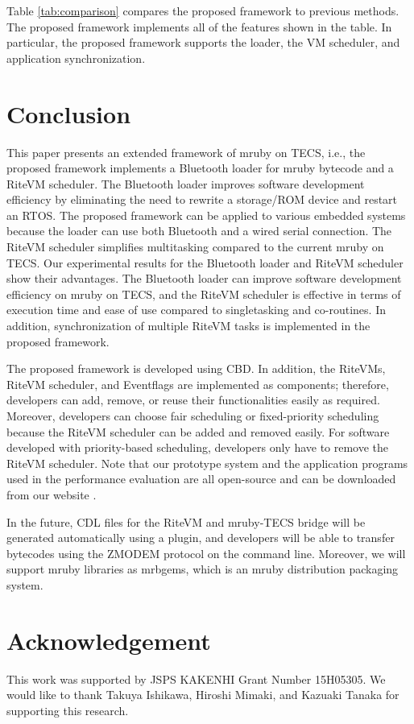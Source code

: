 \documentclass{sig-alternate-05-2015}
\begin{document}
Table \ref{tab:comparison} compares the proposed framework to previous methods.
The proposed framework implements all of the features shown in the table.
In particular, the proposed framework supports the loader, the VM scheduler, and application synchronization.
 
\section{Conclusion}
\label{sec:Conclusion}
This paper presents an extended framework of mruby on TECS, i.e., the proposed framework implements a Bluetooth loader for mruby bytecode and a RiteVM scheduler.
The Bluetooth loader improves software development efficiency by eliminating the need to rewrite a storage/ROM device and restart an RTOS.
The proposed framework can be applied to various embedded systems because the loader can use both Bluetooth and a wired serial connection.
The RiteVM scheduler simplifies multitasking compared to the current mruby on TECS.
Our experimental results for the Bluetooth loader and RiteVM scheduler show their advantages.
The Bluetooth loader can improve software development efficiency on mruby on TECS, and the RiteVM scheduler is effective in terms of execution time and ease of use compared to singletasking and co-routines.
In addition, synchronization of multiple RiteVM tasks is implemented in the proposed framework.

The proposed framework is developed using CBD.
In addition, the RiteVMs, RiteVM scheduler, and Eventflags are implemented as components; therefore, developers can add, remove, or reuse their functionalities easily as required.
Moreover, developers can choose fair scheduling or fixed-priority scheduling because the RiteVM scheduler can be added and removed easily.
For software developed with priority-based scheduling, developers only have to remove the RiteVM scheduler.
Note that our prototype system and the application programs used in the performance evaluation are all open-source and can be downloaded from our website \cite{url:download}.

In the future, CDL files for the RiteVM and mruby-TECS bridge will be generated automatically using a plugin, and developers will be able to transfer bytecodes using the ZMODEM protocol on the command line.
Moreover, we will support mruby libraries as mrbgems, which is an mruby distribution packaging system.

\section{Acknowledgement}
This work was supported by JSPS KAKENHI Grant Number 15H05305.
We would like to thank Takuya Ishikawa, Hiroshi Mimaki, and Kazuaki Tanaka for supporting this research.


\end{document}
